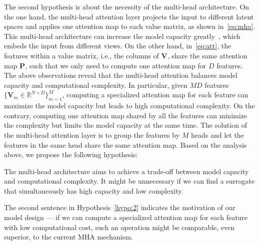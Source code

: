 The second hypothesis is about the necessity of the multi-head architecture. 
On the one hand, the multi-head attention layer projects the input to different latent spaces and applies one attention map to each value matrix, as shown in~\eqref{eq:mha}. 
This multi-head architecture can increase the model capacity greatly~\cite{vaswani2017attention}, which embeds the input from different views. 
On the other hand, in~\eqref{eq:att}, the features within a value matrix, i.e., the columns of $\bm{V}$, share the same attention map $\bm{P}$, such that we only need to compute one attention map for $D$ features. 
The above observations reveal that the multi-head attention balances model capacity and computational complexity. 
In particular, given $MD$ features $\{\bm{V}_m\in\mathbb{R}^{N\times D}\}_{m=1}^{M}$, computing a specialized attention map for each feature can maximize the model capacity but leads to high computational complexity.
On the contrary, computing one attention map shared by all the features can minimize the complexity but limits the model capacity at the same time.
The solution of the multi-head attention layer is to group the features by $M$ heads and let the features in the same head share the same attention map. 
Based on the analysis above, we propose the following hypothesis: 
\begin{hypothesis}\label{hypo:2}
The multi-head architecture aims to achieve a trade-off between model capacity and computational complexity. 
It might be unnecessary if we can find a surrogate that simultaneously has high capacity and low complexity.
\end{hypothesis}
The second sentence in Hypothesis~\ref{hypo:2} indicates the motivation of our model design --- if we can compute a specialized attention map for each feature with low computational cost, such an operation might be comparable, even superior, to the current MHA mechanism.



